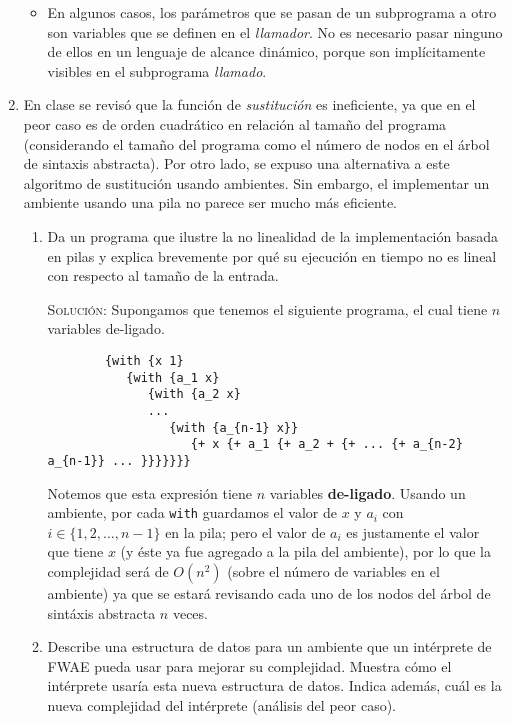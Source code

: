 \documentclass[letterpaper,11pt]{article}
\begin{document}
\begin{enumerate}
\begin{itemize}
        \item En algunos casos, los parámetros que se pasan de un subprograma a
        otro son variables que se definen en el \textit{llamador}. No es 
        necesario pasar ninguno de ellos en un lenguaje de alcance dinámico, 
        porque son implícitamente visibles en el subprograma \textit{llamado}.
    \end{itemize}
    
    \item En clase se revisó que la función de \textit{sustitución} es 
    ineficiente, ya que en el peor caso es de orden cuadrático en relación 
    al tamaño del programa (considerando el tamaño del programa como el 
    número de nodos en el árbol de sintaxis abstracta). Por otro lado, se 
    expuso una alternativa a este algoritmo de sustitución usando 
    ambientes. Sin embargo, el implementar un ambiente usando una pila no 
    parece ser mucho más eficiente.
    \begin{enumerate}
        \item Da un programa que ilustre la no linealidad de la implementación
        basada en pilas y explica brevemente por qué su ejecución en tiempo no
        es lineal con respecto al tamaño de la entrada.

        \textsc{Solución:} Supongamos que tenemos el siguiente programa, el 
        cual tiene $n$ variables de-ligado.
        \begin{verbatim}
        {with {x 1} 
           {with {a_1 x} 
              {with {a_2 x} 
              ...
                 {with {a_{n-1} x}} 
                    {+ x {+ a_1 {+ a_2 + {+ ... {+ a_{n-2} a_{n-1}} ... }}}}}}}
        \end{verbatim}

        Notemos que esta expresión tiene $n$ variables \textbf{de-ligado}. Usando 
        un ambiente, por cada \texttt{with} guardamos el valor de $x$ y $a_i$ 
        con $i \in \{1, 2, \ldots, n-1\}$ en la pila; pero el valor de $a_i$ es 
        justamente el valor que tiene $x$ (y éste ya fue agregado a la pila 
        del ambiente), por lo que la complejidad será de $O(n^2)$ (sobre el 
        número de variables en el ambiente) ya que se estará revisando cada 
        uno de los nodos del árbol de sintáxis abstracta $n$ veces.

        \item Describe una estructura de datos para un ambiente que un 
        intérprete de FWAE pueda usar para mejorar su complejidad. Muestra 
        cómo el intérprete usaría esta nueva estructura de datos. Indica 
        además, cuál es la nueva complejidad del intérprete (análisis del 
        peor caso).


\end{enumerate}
\end{enumerate}
\end{document}
